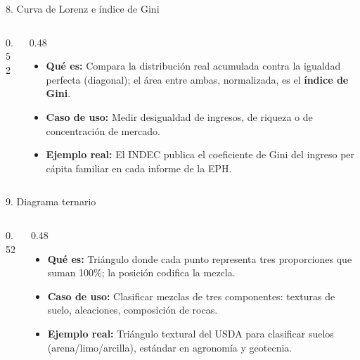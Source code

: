 \documentclass[aspectratio=169,9pt]{beamer}
\newcommand{\ficha}[3]{%
\begin{itemize}
\item \textbf{Qué es:} #1
\item \textbf{Caso de uso:} #2
\item \textbf{Ejemplo real:} #3
\end{itemize}}
\begin{document}
\begin{frame}{8. Curva de Lorenz e índice de Gini}
\begin{columns}[T]
\begin{column}{0.52\textwidth}
\centering
{}
\end{column}
\begin{column}{0.48\textwidth}
\ficha{Compara la distribución real acumulada contra la igualdad perfecta (diagonal); el área entre ambas, normalizada, es el \textbf{índice de Gini}.}
{Medir desigualdad de ingresos, de riqueza o de concentración de mercado.}
{El INDEC publica el coeficiente de Gini del ingreso per cápita familiar en cada informe de la EPH.}
\end{column}
\end{columns}
\end{frame}

\begin{frame}{9. Diagrama ternario}
\begin{columns}[T]
\begin{column}{0.52\textwidth}
\centering
{}
\end{column}
\begin{column}{0.48\textwidth}
\ficha{Triángulo donde cada punto representa tres proporciones que suman 100\%; la posición codifica la mezcla.}
{Clasificar mezclas de tres componentes: texturas de suelo, aleaciones, composición de rocas.}
{Triángulo textural del USDA para clasificar suelos (arena/limo/arcilla), estándar en agronomía y geotecnia.}
\end{column}
\end{columns}
\end{frame}
\end{document}
